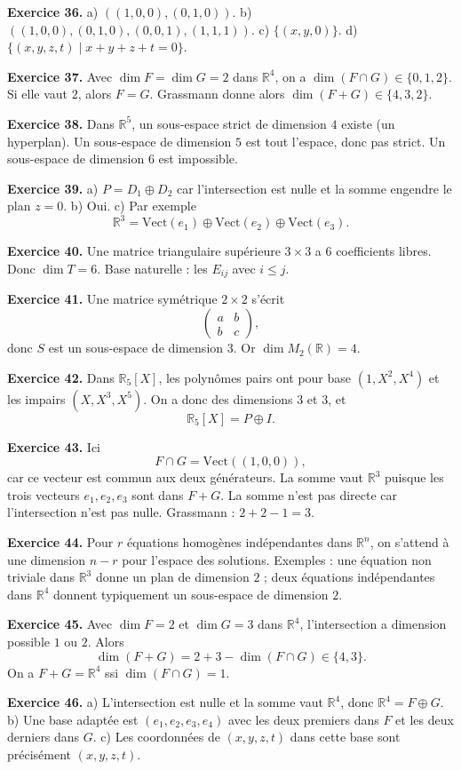 \documentclass[11pt,a4paper]{article}
\newcommand{\R}{\mathbb R}
\newcommand{\Vect}{\mathrm{Vect}}
\begin{document}
\textbf{Exercice 36.} a) $((1,0,0),(0,1,0))$. b) $((1,0,0),(0,1,0),(0,0,1),(1,1,1))$. c) $\{(x,y,0)\}$. d) $\{(x,y,z,t)\mid x+y+z+t=0\}$.

\textbf{Exercice 37.} Avec $\dim F=\dim G=2$ dans $\R^4$, on a $\dim(F\cap G)\in\{0,1,2\}$. Si elle vaut $2$, alors $F=G$. Grassmann donne alors $\dim(F+G)\in\{4,3,2\}$.

\textbf{Exercice 38.} Dans $\R^5$, un sous-espace strict de dimension $4$ existe (un hyperplan). Un sous-espace de dimension $5$ est tout l'espace, donc pas strict. Un sous-espace de dimension $6$ est impossible.

\textbf{Exercice 39.} a) $P=D_1\oplus D_2$ car l'intersection est nulle et la somme engendre le plan $z=0$. b) Oui. c) Par exemple
\[\R^3=\Vect(e_1)\oplus \Vect(e_2)\oplus \Vect(e_3).\]

\textbf{Exercice 40.} Une matrice triangulaire supérieure $3\times 3$ a $6$ coefficients libres. Donc $\dim T=6$. Base naturelle : les $E_{ij}$ avec $i\le j$.

\textbf{Exercice 41.} Une matrice symétrique $2\times 2$ s'écrit
\[\begin{pmatrix}a&b\\b&c\end{pmatrix},\]
donc $S$ est un sous-espace de dimension $3$. Or $\dim M_2(\R)=4$.

\textbf{Exercice 42.} Dans $\R_5[X]$, les polynômes pairs ont pour base $(1,X^2,X^4)$ et les impairs $(X,X^3,X^5)$. On a donc des dimensions $3$ et $3$, et
\[\R_5[X]=P\oplus I.\]

\textbf{Exercice 43.} Ici
\[F\cap G=\Vect((1,0,0)),\]
car ce vecteur est commun aux deux générateurs. La somme vaut $\R^3$ puisque les trois vecteurs $e_1,e_2,e_3$ sont dans $F+G$. La somme n'est pas directe car l'intersection n'est pas nulle. Grassmann : $2+2-1=3$.

\textbf{Exercice 44.} Pour $r$ équations homogènes indépendantes dans $\R^n$, on s'attend à une dimension $n-r$ pour l'espace des solutions. Exemples : une équation non triviale dans $\R^3$ donne un plan de dimension $2$ ; deux équations indépendantes dans $\R^4$ donnent typiquement un sous-espace de dimension $2$.

\textbf{Exercice 45.} Avec $\dim F=2$ et $\dim G=3$ dans $\R^4$, l'intersection a dimension possible $1$ ou $2$. Alors
\[\dim(F+G)=2+3-\dim(F\cap G)\in\{4,3\}.\]
On a $F+G=\R^4$ ssi $\dim(F\cap G)=1$.

\textbf{Exercice 46.} a) L'intersection est nulle et la somme vaut $\R^4$, donc $\R^4=F\oplus G$. b) Une base adaptée est $(e_1,e_2,e_3,e_4)$ avec les deux premiers dans $F$ et les deux derniers dans $G$. c) Les coordonnées de $(x,y,z,t)$ dans cette base sont précisément $(x,y,z,t)$.
\end{document}
